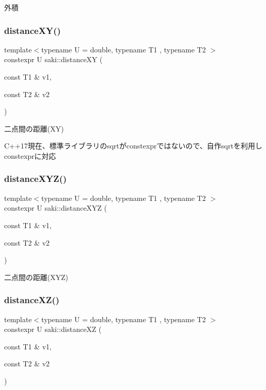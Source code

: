 外積 

\mbox{\label{namespacesaki_ac7860b024b9f60e5d2426448504cdfa5}} 
\subsubsection{\texorpdfstring{distance\+X\+Y()}{distanceXY()}}
{\footnotesize\ttfamily template$<$typename U  = double, typename T1 , typename T2 $>$ \\
constexpr U saki\+::distance\+XY (\begin{DoxyParamCaption}\item[{const T1 \&}]{v1,  }\item[{const T2 \&}]{v2 }\end{DoxyParamCaption})}



二点間の距離(\+X\+Y) 

C++17現在、標準ライブラリのsqrtがconstexprではないので、自作sqrtを利用しconstexprに対応 \mbox{\label{namespacesaki_aca24fd78c511e7ccd8f14a9c04eff7e9}} 
\subsubsection{\texorpdfstring{distance\+X\+Y\+Z()}{distanceXYZ()}}
{\footnotesize\ttfamily template$<$typename U  = double, typename T1 , typename T2 $>$ \\
constexpr U saki\+::distance\+X\+YZ (\begin{DoxyParamCaption}\item[{const T1 \&}]{v1,  }\item[{const T2 \&}]{v2 }\end{DoxyParamCaption})}



二点間の距離(\+X\+Y\+Z) 

\mbox{\label{namespacesaki_aa160b674649d86e048ff2676e20b0d25}} 
\subsubsection{\texorpdfstring{distance\+X\+Z()}{distanceXZ()}}
{\footnotesize\ttfamily template$<$typename U  = double, typename T1 , typename T2 $>$ \\
constexpr U saki\+::distance\+XZ (\begin{DoxyParamCaption}\item[{const T1 \&}]{v1,  }\item[{const T2 \&}]{v2 }\end{DoxyParamCaption})}



